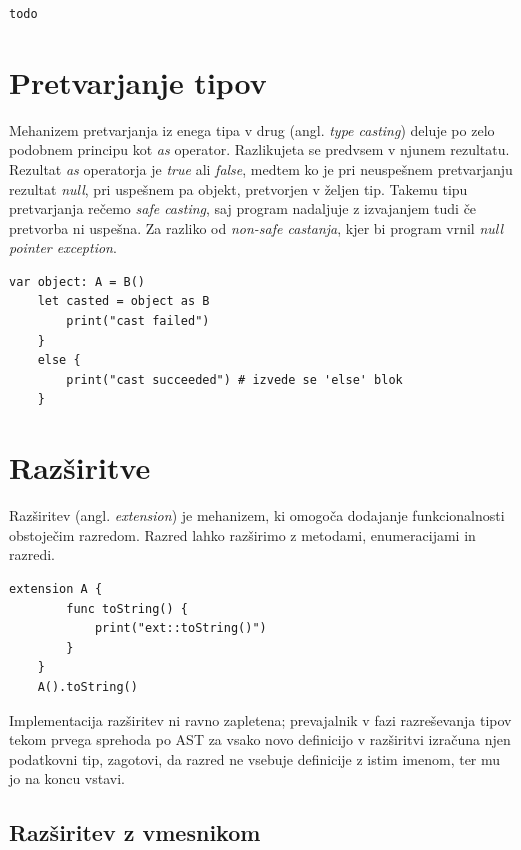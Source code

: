 \documentclass[a4paper, 12p]{book}
\begin{document}
\begin{lstlisting}[caption={Algoritem za izračun ali je objekt instanca danega razeda.}, captionpos=b]
todo
\end{lstlisting}

\section{Pretvarjanje tipov}

Mehanizem pretvarjanja iz enega tipa v drug (angl. \textit{type casting}) deluje po zelo podobnem principu kot \textit{as} operator. Razlikujeta se predvsem v njunem rezultatu. Rezultat \textit{as} operatorja je \textit{true} ali \textit{false}, medtem ko je pri neuspešnem pretvarjanju rezultat \textit{null}, pri uspešnem pa objekt, pretvorjen v željen tip. Takemu tipu pretvarjanja rečemo \textit{safe casting}, saj program nadaljuje z izvajanjem tudi če pretvorba ni uspešna. Za razliko od \textit{non-safe castanja}, kjer bi program vrnil \textit{null pointer exception}.

\begin{lstlisting}[caption={Pretvorba za razrede iz sheme ~\ref{vtables}.}, captionpos=b]
	var object: A = B()
	let casted = object as B
	    print("cast failed")
	}
	else {
	    print("cast succeeded") # izvede se 'else' blok
	}
\end{lstlisting}

\section{Razširitve}

Razširitev (angl. \textit{extension}) je mehanizem, ki omogoča dodajanje funkcionalnosti obstoječim razredom. Razred lahko razširimo z metodami, enumeracijami in razredi.  

\begin{lstlisting}[caption={Razširitev razreda A.}, captionpos=b]
	extension A {
	    func toString() {
	        print("ext::toString()")
	    }
	}
	A().toString()
\end{lstlisting}

Implementacija razširitev ni ravno zapletena; prevajalnik v fazi razreševanja tipov tekom prvega sprehoda po AST za vsako novo definicijo v razširitvi izračuna njen podatkovni tip, zagotovi, da razred ne vsebuje definicije z istim imenom, ter mu jo na koncu vstavi.

\subsection{Razširitev z vmesnikom}
\end{document}
